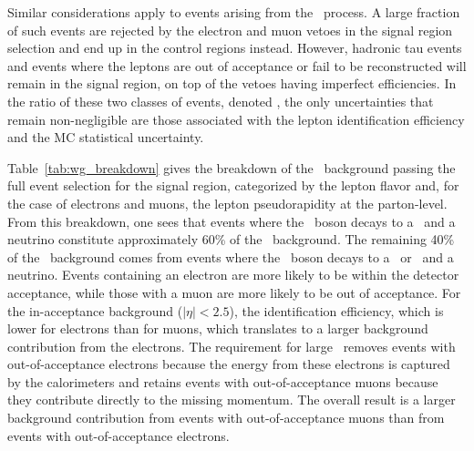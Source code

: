 Similar considerations apply to events arising from the \wlng\ process. 
A large fraction of such events are rejected by the electron and muon vetoes in the signal region selection and end up in the control regions instead. 
However, hadronic tau events and events where the leptons are out of acceptance or fail to be reconstructed will remain in the signal region, on top of the vetoes having imperfect efficiencies. 
In the ratio of these two classes of events, denoted \RWl, the only uncertainties that remain non-negligible are those associated with the lepton identification efficiency and the MC statistical uncertainty.

Table~\ref{tab:wg_breakdown} gives the breakdown of the \wlng\ background passing the full event selection for the signal region, categorized by the lepton flavor and, for the case of electrons and muons, the lepton pseudorapidity at the parton-level. 
From this breakdown, one sees that events where the \PW\ boson decays to a \Pgt\ and a neutrino constitute approximately 60\% of the \wlng\ background. 
The remaining 40\% of the \wlng\ background comes from events where the \PW\ boson decays to a \Pgm\ or \Pe\ and a neutrino.
Events containing an electron are more likely to be within the detector acceptance, while those with a muon are more likely to be out of acceptance.
For the in-acceptance background ($|\eta| < 2.5$), the identification efficiency, which is lower for electrons than for muons, which translates to a larger background contribution from the electrons. 
The requirement for large \met\ removes events with out-of-acceptance electrons because the energy from these electrons is captured by the calorimeters and retains events with out-of-acceptance muons because they contribute directly to the missing momentum.
The overall result is a larger background contribution from events with out-of-acceptance muons than from events with out-of-acceptance electrons. 

